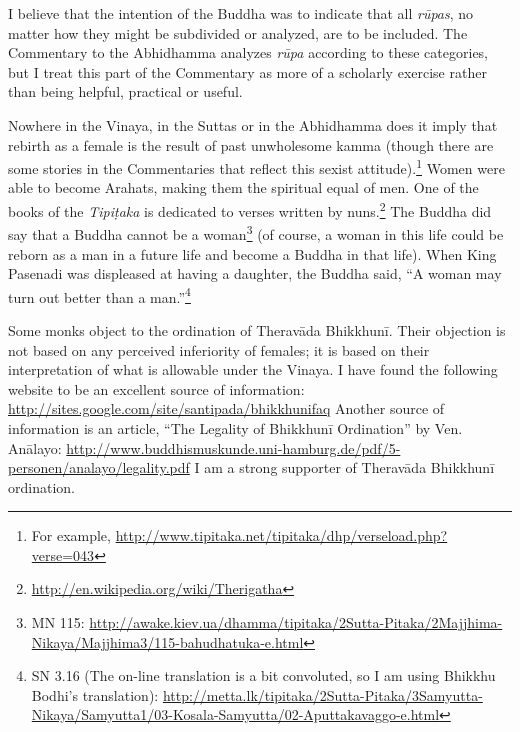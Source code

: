 
I believe that the intention of the Buddha was to indicate that all \textit{rūpas}, no matter how they might be subdivided or analyzed, are to be included. The Commentary to the Abhidhamma analyzes \textit{rūpa} according to these categories, but I treat this part of the Commentary as more of a scholarly exercise rather than being helpful, practical or useful.


Nowhere in the Vinaya, in the Suttas or in the Abhidhamma does it imply that rebirth as a female is the result of past unwholesome kamma (though there are some stories in the Commentaries that reflect this sexist attitude).\footnote{For example, \url{http://www.tipitaka.net/tipitaka/dhp/verseload.php?verse=043}} Women were able to become Arahats, making them the spiritual equal of men. One of the books of the \textit{Tipiṭaka} is dedicated to verses written by nuns.\footnote{\url{http://en.wikipedia.org/wiki/Therigatha}} The Buddha did say that a Buddha cannot be a woman\footnote{MN 115: \url{http://awake.kiev.ua/dhamma/tipitaka/2Sutta-Pitaka/2Majjhima-Nikaya/Majjhima3/115-bahudhatuka-e.html}} (of course, a woman in this life could be reborn as a man in a future life and become a Buddha in that life). When King Pasenadi was displeased at having a daughter, the Buddha said, “A woman may turn out better than a man.”\footnote{SN 3.16 (The on-line translation is a bit convoluted, so I am using Bhikkhu Bodhi’s translation): \url{http://metta.lk/tipitaka/2Sutta-Pitaka/3Samyutta-Nikaya/Samyutta1/03-Kosala-Samyutta/02-Aputtakavaggo-e.html}}

Some monks object to the ordination of Theravāda Bhikkhunī. Their objection is not based on any perceived inferiority of females; it is based on their interpretation of what is allowable under the Vinaya. I have found the following website to be an excellent source of information: \url{http://sites.google.com/site/santipada/bhikkhunifaq} Another source of information is an article, “The Legality of Bhikkhunī Ordination” by Ven. Anālayo: \url{http://www.buddhismuskunde.uni-hamburg.de/pdf/5-personen/analayo/legality.pdf} I am a strong supporter of Theravāda Bhikkhunī ordination.
